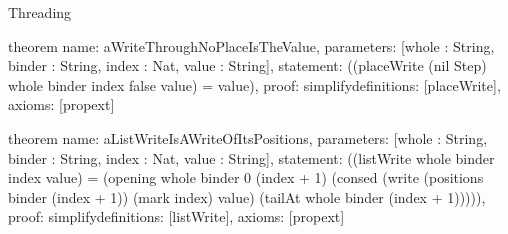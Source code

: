 \begin{lexlean}{Threading}
\begin{semanticmodule}
theorem{
  name: aWriteThroughNoPlaceIsTheValue,
  parameters: [whole : String, binder : String, index : Nat, value : String],
  statement: ((placeWrite (nil Step) whole binder index false value) = value),
  proof: simplify{definitions: [placeWrite]},
  axioms: [propext]
}

theorem{
  name: aListWriteIsAWriteOfItsPositions,
  parameters: [whole : String, binder : String, index : Nat, value : String],
  statement: ((listWrite whole binder index value) = (opening whole binder 0 (index + 1) (consed (write (positions binder (index + 1)) (mark index) value) (tailAt whole binder (index + 1))))),
  proof: simplify{definitions: [listWrite]},
  axioms: [propext]
}
\end{semanticmodule}
\end{lexlean}
